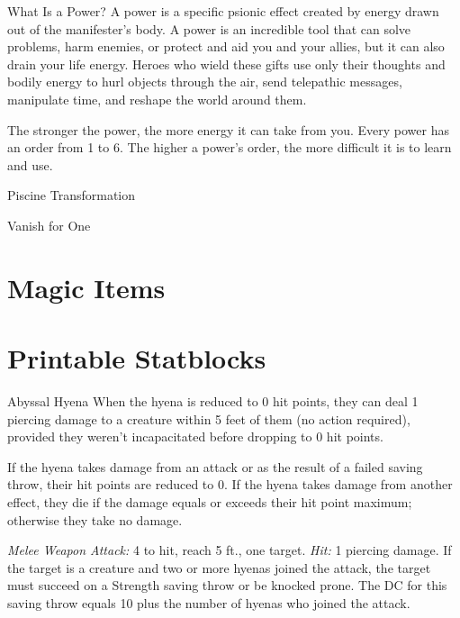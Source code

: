 \documentclass[10pt,a4paper,twoside,bg=print,twocolumn,openany,nodeprecatedcode]{dndbook}
\begin{document}
\begin{DndSidebar}[float=!b]{What Is a Power?}
A power is a specific psionic effect created by energy drawn out of the manifester's body. A power is an incredible tool that can solve problems, harm enemies, or protect and aid you and your allies, but it can also drain your life energy. Heroes who wield these gifts use only their thoughts and bodily energy to hurl objects through the air, send telepathic messages, manipulate time, and reshape the world around them.



The stronger the power, the more energy it can take from you. Every power has an order from 1 to 6. The higher a power's order, the more difficult it is to learn and use.



\end{DndSidebar}

Piscine Transformation

Vanish for One

\chapter{Magic Items}

\chapter*{Printable Statblocks}
\pagestyle{empty}

\begin{DndMonster}[float=t]{Abyssal Hyena}
\DndMonsterBasics[
armor-class = {11},
hit-points = {\DndDice{8}},
speed = {50 ft.}
]
\DndMonsterAbilityScores[
 str = 14,
 dex = 13,
 con = 12,
 int = 5,
 wis = 12,
 cha = 7
]
\DndMonsterDetails[
senses = {darkvision 60 ft., passive perception 11},
languages = {understands Abyssal but can't speak},
challenge = 1,
]
When the hyena is reduced to 0 hit points, they can deal 1 piercing damage to a creature within 5 feet of them (no action required), provided they weren't incapacitated before dropping to 0 hit points.

If the hyena takes damage from an attack or as the result of a failed saving throw, their hit points are reduced to 0. If the hyena takes damage from another effect, they die if the damage equals or exceeds their hit point maximum; otherwise they take no damage.

\textsl{Melee Weapon Attack:} 4 to hit, reach 5 ft., one target. \textsl{Hit:} 1 piercing damage. If the target is a creature and two or more hyenas joined the attack, the target must succeed on a Strength saving throw or be knocked prone. The DC for this saving throw equals 10 plus the number of hyenas who joined the attack.

\end{DndMonster}
\end{document}
